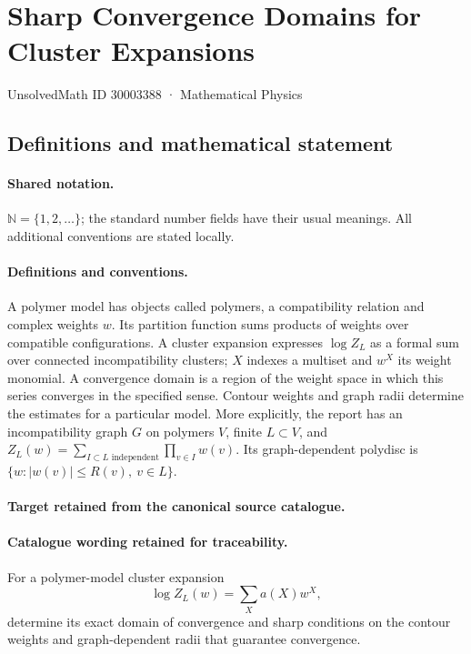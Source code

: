 \documentclass[11pt]{article}
\begin{document}
\setcounter{section}{30003387}
\section{Sharp Convergence Domains for Cluster Expansions}\label{30003388}
{\small UnsolvedMath ID 30003388 · Mathematical Physics}
\subsection{Definitions and mathematical statement}

\paragraph{Shared notation.}$\mathbb N=\{1,2,\ldots\}$; the standard number fields have their usual meanings. All additional conventions are stated locally.


\paragraph{Definitions and conventions.}
A polymer model has objects called polymers, a compatibility relation and complex weights $w$. Its partition function sums products of weights over compatible configurations. A cluster expansion expresses $\log Z_L$ as a formal sum over connected incompatibility clusters; $X$ indexes a multiset and $w^X$ its weight monomial. A convergence domain is a region of the weight space in which this series converges in the specified sense. Contour weights and graph radii determine the estimates for a particular model. More explicitly, the report has an incompatibility graph $G$ on polymers $V$, finite $L\subset V$, and $Z_L(w)=\sum_{I\subset L\text{ independent}}\prod_{v\in I}w(v)$. Its graph-dependent polydisc is $\{w:|w(v)|\leq R(v),\ v\in L\}$.

\paragraph{Target retained from the canonical source catalogue.}
\paragraph{Catalogue wording retained for traceability.}
For a polymer-model cluster expansion
$$
\log Z_L(w)=\sum_X a(X)w^X,
$$
determine its exact domain of convergence and sharp conditions on the contour weights and graph-dependent radii that guarantee convergence.
\end{document}
